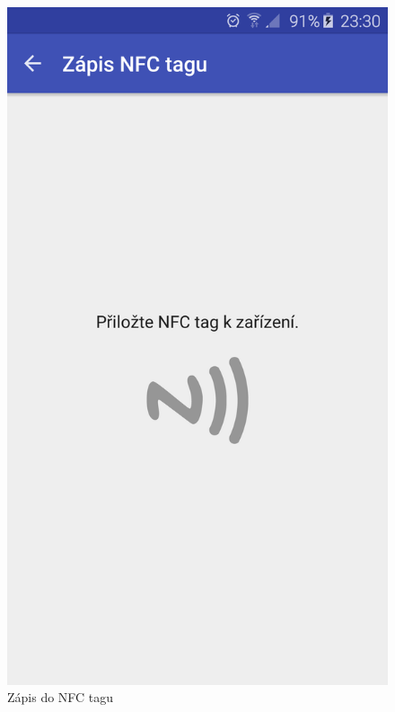 \documentclass[czech,master,public,dept460,male,java,cpdeclaration]{diploma}
\begin{document}
\begin{figure}[H]
\begin{minipage}{.5\textwidth}
\centering
                \includegraphics[scale=0.14]{img/screen/zapisnfcdetail.png}
        \caption{Zápis do NFC tagu}
        \label{fig:nfczapis}
\end{minipage}
\begin{minipage}{.5\textwidth}
    \centering

\end{minipage}
\end{figure}
\end{document}
